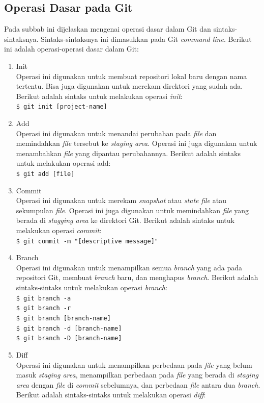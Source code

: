 \subsection{Operasi Dasar pada Git}
\label{subsec:operasi_dasar_git}
Pada subbab ini dijelaskan mengenai operasi dasar dalam Git dan sintaks-sintaksnya. Sintaks-sintaksnya ini dimasukkan pada Git \textit{command line}. Berikut ini adalah operasi-operasi dasar dalam Git:
\begin{enumerate}
\item Init\\
Operasi ini digunakan untuk membuat repositori lokal baru dengan nama tertentu. Bisa juga digunakan untuk merekam direktori yang sudah ada. Berikut adalah sintaks untuk melakukan operasi  \textit{init}:\\
\texttt{\$ git init [project-name]}  
\item Add\\
Operasi ini digunakan untuk menandai perubahan pada \textit{file} dan memindahkan \textit{file} tersebut ke \textit{staging area}. Operasi ini juga digunakan untuk menambahkan \textit{file} yang dipantau perubahannya. Berikut adalah sintaks untuk melakukan operasi add:\\
\texttt{\$ git add [file]}  
\item Commit\\
Operasi ini digunakan untuk merekam \textit{snapshot} atau \textit{state} \textit{file} atau sekumpulan \textit{file}. Operasi ini juga digunakan untuk memindahkan \textit{file} yang berada di \textit{stagging area} ke direktori Git. Berikut adalah sintaks untuk melakukan operasi \textit{commit}:\\
\texttt{\$ git commit -m "[descriptive message]"}  
\item Branch\\
Operasi ini digunakan untuk menampilkan semua \textit{branch} yang ada pada repositori Git, membuat \textit{branch} baru, dan menghapus \textit{branch}. Berikut adalah sintaks-sintaks untuk melakukan operasi \textit{branch}:\\
\texttt{\$ git branch -a}\\ 
\texttt{\$ git branch -r}\\
\texttt{\$ git branch [branch-name]}\\
\texttt{\$ git branch -d [branch-name]}\\
\texttt{\$ git branch -D [branch-name]} 
\item Diff\\
Operasi ini digunakan untuk menampilkan perbedaan pada \textit{file} yang belum masuk \textit{staging area}, menampilkan perbedaan pada \textit{file} yang berada di \textit{staging area} dengan \textit{file} di \textit{commit} sebelumnya, dan perbedaan \textit{file} antara dua \textit{branch}.  Berikut adalah sintaks-sintaks untuk melakukan operasi \textit{diff}:\\

\end{enumerate}

